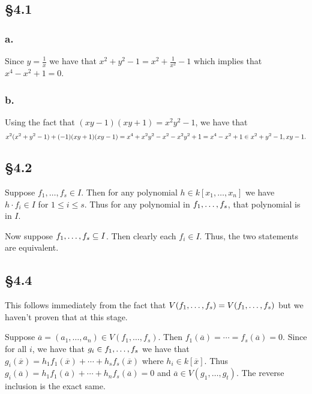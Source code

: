 \documentclass[letterpaper]{article}
\begin{document}
\subsection*{\S 4.1}

\subsubsection*{a.}

Since $y = \frac{1}{x}$ we have that $x^{2} + y^{2} - 1 = x^{2} + \frac{1}{x^{2}} - 1$ which implies that $x^{4} - x^{2} + 1 = 0$.

\subsubsection*{b.}

Using the fact that $(xy - 1)(xy + 1) = x^{2}y^{2} - 1$, we have that
\[
  x^{2}(x^{2} + y^{2} - 1) + (-1)(xy + 1)(xy - 1) = x^{4} + x^{2}y^{2} - x^{2} - x^{2}y^{2} + 1 = x^{4} - x^{2} + 1 \in \ideal{x^{2} + y^{2} - 1, xy - 1}.
\]

\subsection*{\S 4.2}

Suppose $f_{1}, \ldots, f_{s} \in I$.
Then for any polynomial $h \in k[x_{1}, \ldots, x_{n}]$ we have $h \cdot f_{i} \in I$ for $1 \leq i \leq s$.
Thus for any polynomial in $\gen{ f_{1}, \ldots, f_{s} }$, that polynomial is in $I$.

Now suppose $\gen{ f_{1}, \ldots, f_{s} } \subseteq I$.
Then clearly each $f_{i} \in I$.
Thus, the two statements are equivalent.

\subsection*{\S 4.4}

This follows immediately from the fact that $V(f_{1}, \ldots, f_{s}) = V(\ideal{f_{1}, \ldots, f_{s}})$ but we haven't proven that at this stage.

Suppose $\overline{a} = (a_{1}, \ldots, a_{n}) \in V(f_{1}, \ldots, f_{s})$.
Then $f_{1}(\overline{a}) = \cdots = f_{s}(\overline{a}) = 0$.
Since for all $i$, we have that $g_{i} \in \ideal{f_{1}, \ldots, f_{s}}$ we have that $g_{i}(\overline{x}) = h_{1}f_{1}(\overline{x}) + \cdots + h_{s}f_{s}(\overline{x})$ where $h_{i} \in k[\overline{x}]$.
Thus $g_{i}(\overline{a}) = h_{1}f_{1}(\overline{a}) + \cdots + h_{n}f_{s}(\overline{a}) = 0$ and $\overline{a} \in V(g_{1}, \ldots, g_{t})$.
The reverse inclusion is the exact same.
\end{document}
